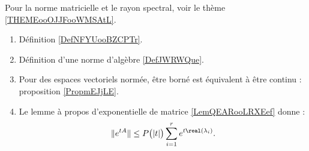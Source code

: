 
         \label{THEMEooHSLLooBQpFAr}
    Pour la norme matricielle et le rayon spectral, voir le thème \ref{THEMEooOJJFooWMSAtL}.
    \begin{enumerate}
        \item
            Définition \ref{DefNFYUooBZCPTr}.
        \item 
            Définition d'une norme d'algèbre \ref{DefJWRWQue}.
        \item
            Pour des espaces vectoriels normée, être borné est équivalent à être continu : proposition \ref{PropmEJjLE}.
        \item
            Le lemme à propos d'exponentielle de matrice \ref{LemQEARooLRXEef} donne :
            \begin{equation}
                \|  e^{tA} \|\leq P\big( | t | \big)\sum_{i=1}^r e^{t\real(\lambda_i)}.
            \end{equation}
    \end{enumerate}

